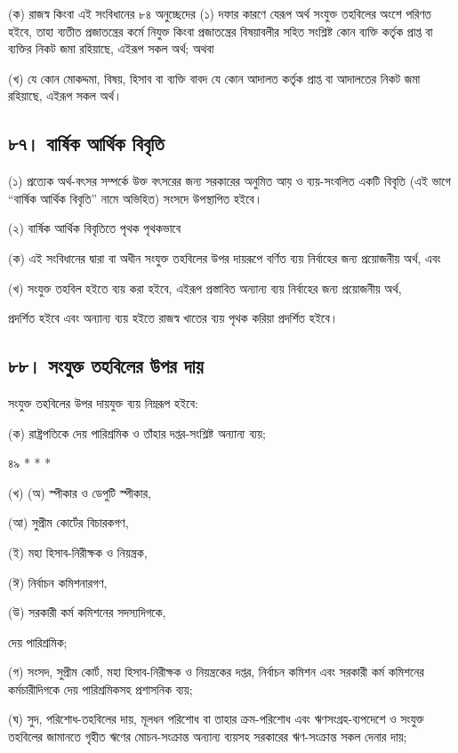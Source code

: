 \documentclass[11pt]{article}
\begin{document}
(ক) রাজস্ব কিংবা এই সংবিধানের ৮৪ অনুচ্ছেদের (১) দফার কারণে যেরূপ অর্থ সংযুক্ত
    তহবিলের অংশে পরিণত হইবে, তাহা ব্যতীত প্রজাতন্ত্রের কর্মে নিযুক্ত কিংবা
    প্রজাতন্ত্রের বিষয়াবলীর সহিত সংশ্লিষ্ট কোন ব্যক্তি কর্তৃক প্রাপ্ত বা ব্যক্তির নিকট
    জমা রহিয়াছে, এইরূপ সকল অর্থ; অথবা

(খ) যে কোন মোকদ্দমা, বিষয়, হিসাব বা ব্যক্তি বাবদ যে কোন আদালত কর্তৃক প্রাপ্ত
    বা আদালতের নিকট জমা রহিয়াছে, এইরূপ সকল অর্থ।

\subsection{৮৭। বার্ষিক আর্থিক বিবৃতি}
\label{sec:org143b928}
(১) প্রত্যেক অর্থ-বৎসর সম্পর্কে উক্ত বৎসরের জন্য সরকারের অনুমিত আয় ও
    ব্যয়-সংবলিত একটি বিবৃতি (এই ভাগে “বার্ষিক আর্থিক বিবৃতি” নামে অভিহিত) সংসদে
    উপস্থাপিত হইবে।

(২) বার্ষিক আর্থিক বিবৃতিতে পৃথক পৃথকভাবে

(ক) এই সংবিধানের দ্বারা বা অধীন সংযুক্ত তহবিলের উপর দায়রূপে বর্ণিত ব্যয়
    নির্বাহের জন্য প্রয়োজনীয় অর্থ, এবং

(খ) সংযুক্ত তহবিল হইতে ব্যয় করা হইবে, এইরূপ প্রস্তাবিত অন্যান্য ব্যয় নির্বাহের
    জন্য প্রয়োজনীয় অর্থ,

প্রদর্শিত হইবে এবং অন্যান্য ব্যয় হইতে রাজস্ব খাতের ব্যয় পৃথক করিয়া প্রদর্শিত
হইবে।

\subsection{৮৮। সংযুক্ত তহবিলের উপর দায়}
\label{sec:org6b716be}
সংযুক্ত তহবিলের উপর দায়যুক্ত ব্যয় নিম্নরূপ হইবে:

(ক) রাষ্ট্রপতিকে দেয় পারিশ্রমিক ও তাঁহার দপ্তর-সংশ্লিষ্ট অন্যান্য ব্যয়;

৪৯ * * *

(খ) (অ) স্পীকার ও ডেপুটি স্পীকার,

(আ) সুপ্রীম কোর্টের বিচারকগণ,

(ই) মহা হিসাব-নিরীক্ষক ও নিয়ন্ত্রক,

(ঈ) নির্বাচন কমিশনারগণ,

(উ) সরকারী কর্ম কমিশনের সদস্যদিগকে,

দেয় পারিশ্রমিক;

(গ) সংসদ, সুপ্রীম কোর্ট, মহা হিসাব-নিরীক্ষক ও নিয়ন্ত্রকের দপ্তর, নির্বাচন
    কমিশন এবং সরকারী কর্ম কমিশনের কর্মচারীদিগকে দেয় পারিশ্রমিকসহ প্রশাসনিক
    ব্যয়;

(ঘ) সুদ, পরিশোধ-তহবিলের দায়, মূলধন পরিশোধ বা তাহার ক্রম-পরিশোধ এবং
    ঋণসংগ্রহ-ব্যপদেশে ও সংযুক্ত তহবিলের জামানতে গৃহীত ঋণের মোচন-সংক্রান্ত অন্যান্য
    ব্যয়সহ সরকারের ঋণ-সংক্রান্ত সকল দেনার দায়;
\end{document}
